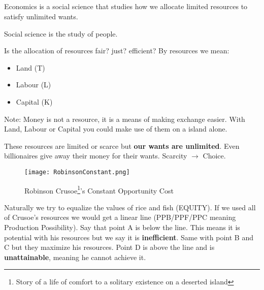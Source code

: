 
\subsection{}
\begin{definition}
    Economics is a social science that studies how we allocate limited resources
    to satisfy unlimited wants.
\end{definition}
\begin{definition}
    Social science is the study of people.
\end{definition}
Is the allocation of resources fair? just? efficient?
By resources we mean:
\begin{itemize}
    \item Land (T)
    \item Labour (L)
    \item Capital (K) 
\end{itemize}
Note: Money is not a resource, it is a means of making exchange easier.
With Land, Labour or Capital you could make use of them on a island alone.

These resources are limited or scarce but \textbf{our wants are unlimited}. Even billionaires give away their money for their wants.
Scarcity $\rightarrow$ Choice.
\begin{figure}[h!]
    \begin{minipage}{\textwidth}
        \centering
        \texttt{[image: RobinsonConstant.png]}
        \caption[Constant Opportunity Cost]{Robinson Crusoe\footnote[1]{Story of a life of comfort to a solitary existence on a deserted island}'s Constant Opportunity Cost}
    \end{minipage}
\end{figure}
\begin{center}
\end{center}
Naturally we try to equalize the values of rice and fish (EQUITY).
If we used all of Crusoe's resources we would get a linear line (PPB/PPF/PPC meaning Production Possibility). Say that point A is below the line. This means it is potential with his resources but we say it is \textbf{inefficient}.
Same with point B and C but they maximize his resources. Point D is above the line and is \textbf{unattainable}, meaning he cannot achieve it.

